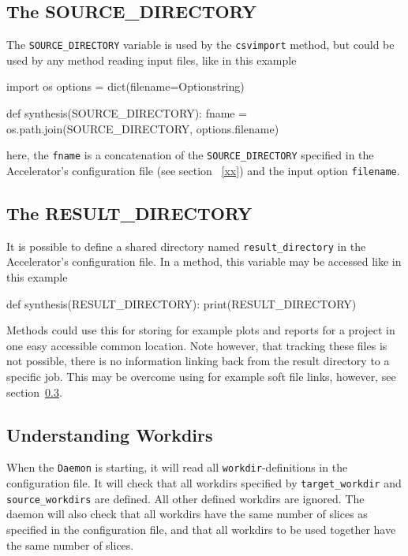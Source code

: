 \subsection{The SOURCE\_DIRECTORY}
The \texttt{SOURCE\_DIRECTORY} variable is used by
the \texttt{csvimport} method, but could be used by any method reading
input files, like in this example
\begin{python}
import os
options = dict(filename=Optionstring)

def synthesis(SOURCE_DIRECTORY):
    fname = os.path.join(SOURCE_DIRECTORY, options.filename)
\end{python}
here, the \texttt{fname} is a concatenation of
the \texttt{SOURCE\_DIRECTORY} specified in the Accelerator's
configuration file (see section ~\ref{xx}) and the input
option \texttt{filename}.


\subsection{The RESULT\_DIRECTORY}
It is possible to define a shared directory
named \texttt{result\_directory} in the Accelerator's configuration
file.  In a method, this variable may be accessed like in this example
\begin{python}
def synthesis(RESULT_DIRECTORY):
    print(RESULT_DIRECTORY)
\end{python}
Methods could use this for storing for example plots and reports for a
project in one easy accessible common location.  Note however, that
tracking these files is not possible, there is no information linking
back from the result directory to a specific job.  This may be
overcome using for example soft file links, however, see section~\ref{}.







\subsection{Understanding Workdirs}
When the \texttt{Daemon} is starting, it will read
all \texttt{workdir}-definitions in the configuration file.  It will
check that all workdirs specified by \texttt{target\_workdir}
and \texttt{source\_workdirs} are defined.  All other defined workdirs
are ignored.  The daemon will also check that all workdirs have the
same number of slices as specified in the configuration file, and that
all workdirs to be used together have the same number of slices.

